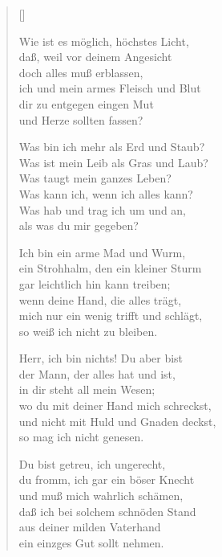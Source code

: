 \begin{multicols}{2}
\settowidth{\versewidth}{Herr, ich bin nichts! Du aber bist}
\begin{verse}[\versewidth]

 Wie ist es möglich, höchstes Licht,\\
daß, weil vor deinem Angesicht\\
doch alles muß erblassen,\\
ich und mein armes Fleisch und Blut\\
dir zu entgegen eingen Mut\\
und Herze sollten fassen?

 Was bin ich mehr als Erd und Staub?\\
Was ist mein Leib als Gras und Laub?\\
Was taugt mein ganzes Leben?\\
Was kann ich, wenn ich alles kann?\\
Was hab und trag ich um und an,\\
als was du mir gegeben?

 Ich bin ein arme Mad und Wurm,\\
ein Strohhalm, den ein kleiner Sturm\\
gar leichtlich hin kann treiben;\\
wenn deine Hand, die alles trägt,\\
mich nur ein wenig trifft und schlägt,\\
so weiß ich nicht zu bleiben.

 Herr, ich bin nichts! Du aber bist\\
der Mann, der alles hat und ist,\\
in dir steht all mein Wesen;\\
wo du mit deiner Hand mich schreckst,\\
und nicht mit Huld und Gnaden deckst,\\
so mag ich nicht genesen.

 Du bist getreu, ich ungerecht,\\
du fromm, ich gar ein böser Knecht\\
und muß mich wahrlich schämen,\\
daß ich bei solchem schnöden Stand\\
aus deiner milden Vaterhand\\
ein einzges Gut sollt nehmen.


\end{verse}
\end{multicols}
